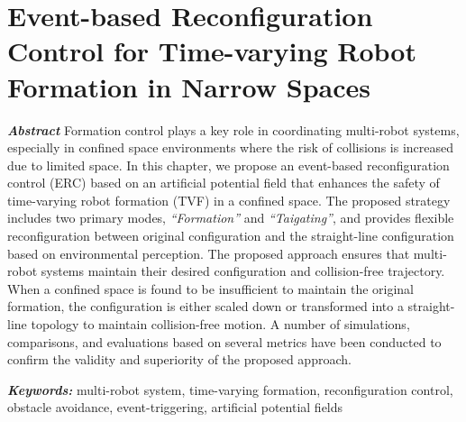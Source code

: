 \chapter{Event-based Reconfiguration Control for Time-varying Robot Formation in Narrow Spaces}\label{paper2}

\vspace{1cm}

\noindent\textit{\textbf{Abstract}}
Formation control plays a key role in coordinating multi-robot systems, especially in confined space environments where the risk of collisions is increased due to limited space. In this chapter, we propose an event-based reconfiguration control (ERC) based on an artificial potential field that enhances the safety of time-varying robot formation (TVF) in a confined space. The proposed strategy includes two primary modes, \textit{``Formation''} and \textit{``Taigating''}, and provides flexible reconfiguration between original configuration and the straight-line configuration based on environmental perception. The proposed approach ensures that multi-robot systems maintain their desired configuration and collision-free trajectory. When a confined space is found to be insufficient to maintain the original formation, the configuration is either scaled down or transformed into a straight-line topology to maintain collision-free motion. A number of simulations, comparisons, and evaluations based on several metrics have been conducted to confirm the validity and superiority of the proposed approach.

\noindent\textbf{\textit{Keywords:}}
multi-robot system, time-varying formation, reconfiguration control, obstacle avoidance, event-triggering, artificial potential fields







